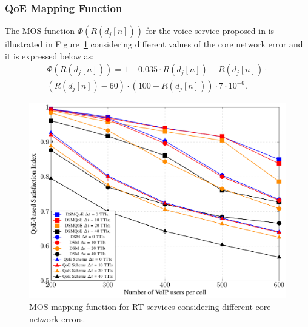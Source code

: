 \documentclass[12pt]{article}
\newcommand{\FigRef}[1]{Figure~\ref{#1}}
\begin{document}
\subsubsection{QoE Mapping Function}	

The  \ac{MOS} function $\Phi\left(R\left(d_j[n]\right)\right)$ for the voice service proposed in \cite{cole2001voice} is illustrated  in \FigRef{Fig:MOSxNetworkError} considering different values of the core network error and it is expressed below as: 
\begin{multline}\label{MOS_DELAY_FUNC}
\Phi\left(R\left(d_j[n]\right)\right) = 1+ 0.035\cdot R\left(d_j[n]\right)+ R\left(d_j[n]\right)\cdot \\
\left(R\left(d_j[n]\right) - 60\right) \cdot \left(100 - R\left(d_j[n]\right)\right)\cdot 7 \cdot  10^{-6}.
\end{multline}

\begin{figure}
	\centering
	\includegraphics[width=0.55\linewidth,page=7]{figs_wp2/figs_BRUNO_PEDRO/plotsCSI}
	\caption{MOS mapping function for RT services considering different core network errors.}
	\label{Fig:MOSxNetworkError}		
\end{figure}
\end{document}
